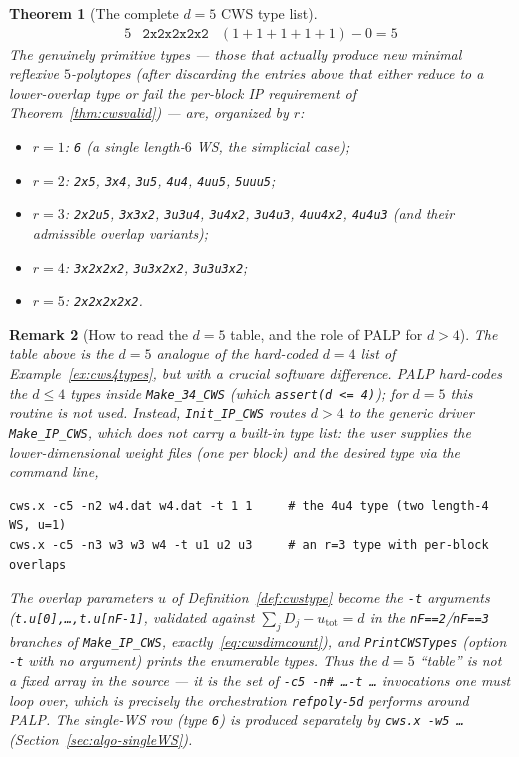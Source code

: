 \documentclass{amsart}
\newtheorem{theorem}{Theorem}[section]
\newtheorem{remark}[theorem]{Remark}
\begin{document}
\begin{theorem}[The complete $d=5$ CWS type list]
\[\begin{array}{lll}
5 & \texttt{2x2x2x2x2}& (1{+}1{+}1{+}1{+}1)-0=5
\end{array}
\]
The genuinely \emph{primitive} types --- those that actually produce new
minimal reflexive $5$-polytopes (after discarding the entries above that
either reduce to a lower-overlap type or fail the per-block IP requirement of
Theorem~\ref{thm:cwsvalid}) --- are, organized by $r$:
\begin{itemize}
  \item $r=1$: \texttt{6} (a single length-$6$ WS, the simplicial case);
  \item $r=2$: \texttt{2x5}, \texttt{3x4}, \texttt{3u5}, \texttt{4u4},
        \texttt{4uu5}, \texttt{5uuu5};
  \item $r=3$: \texttt{2x2u5}, \texttt{3x3x2}, \texttt{3u3u4},
        \texttt{3u4x2}, \texttt{3u4u3}, \texttt{4uu4x2}, \texttt{4u4u3}
        (and their admissible overlap variants);
  \item $r=4$: \texttt{3x2x2x2}, \texttt{3u3x2x2}, \texttt{3u3u3x2};
  \item $r=5$: \texttt{2x2x2x2x2}.
\end{itemize}
\end{theorem}

\begin{remark}[How to read the $d=5$ table, and the role of PALP for $d>4$]
\label{rmk:cws5}
The table above is the $d=5$ analogue of the hard-coded $d=4$ list of
Example~\ref{ex:cws4types}, but with a crucial software difference. PALP
\emph{hard-codes} the $d\le 4$ types inside \texttt{Make\_34\_CWS} (which
\texttt{assert(d <= 4)}); for $d=5$ this routine is \emph{not} used. Instead,
\texttt{Init\_IP\_CWS} routes $d>4$ to the \emph{generic} driver
\texttt{Make\_IP\_CWS}, which does \emph{not} carry a built-in type list:
the user supplies the lower-dimensional weight files (one per block) and the
desired type via the command line,
\begin{verbatim}
cws.x -c5 -n2 w4.dat w4.dat -t 1 1     # the 4u4 type (two length-4 WS, u=1)
cws.x -c5 -n3 w3 w3 w4 -t u1 u2 u3     # an r=3 type with per-block overlaps
\end{verbatim}
The overlap parameters $u$ of Definition~\ref{def:cwstype} become the
\texttt{-t} arguments (\texttt{t.u[0],\dots,t.u[nF-1]}, validated against
$\sum_j D_j - u_{\mathrm{tot}} = d$ in the \texttt{nF==2}/\texttt{nF==3}
branches of \texttt{Make\_IP\_CWS}, exactly~\eqref{eq:cwsdimcount}), and
\texttt{PrintCWSTypes} (option \texttt{-t} with no argument) prints the
enumerable types. Thus the $d=5$ ``table'' is not a fixed array in the
source --- it is the set of \texttt{-c5 -n\# \dots -t \dots} invocations one
must \emph{loop over}, which is precisely the orchestration
\texttt{refpoly-5d} performs around PALP. The single-WS row (type \texttt{6})
is produced separately by \texttt{cws.x -w5 \dots} (Section~\ref{sec:algo-singleWS}).
\end{remark}
\end{document}
